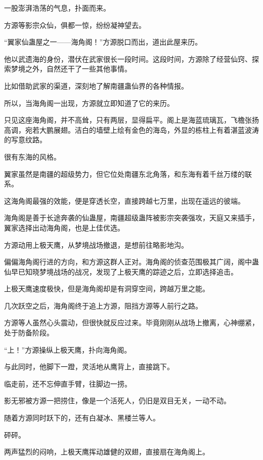 
\begin{this_body}

一股澎湃浩荡的气息，扑面而来。

方源等影宗众仙，俱都一惊，纷纷凝神望去。

“翼家仙蛊屋之一——海角阁！”方源脱口而出，道出此屋来历。

他以武遗海的身份，潜伏在武家很长一段时间。这段时间，方源除了经营仙窍、探索梦境之外，自然还干了一些其他事情。

比如借助武家的渠道，深刻地了解南疆蛊仙界的各种情报。

所以，当海角阁一出现，方源就立即知道了它的来历。

只见这座海角阁，并不高耸，只有两层，显得扁平。阁上是海蓝琉璃瓦，飞檐张扬高调，宛若大鹏展翅。洁白的墙壁上绘有金色的海岛，外显的栋柱上有着湛蓝波涛的写意纹路。

很有东海的风格。

翼家虽然是南疆的超级势力，但它位处南疆东北角落，和东海有着千丝万缕的联系。

这海角阁最强的效能，便是穿透长空，直接跨越七万里，出现在遥远的彼端。

海角阁是善于长途奔袭的仙蛊屋，南疆超级蛊阵被影宗突袭强攻，天庭又来插手，翼家选择出动海角阁，也是上佳优选。

方源动用上极天鹰，从梦境战场撤退，是想前往略影地沟。

偏偏海角阁行进的方向，和方源这群人正对。海角阁的侦查范围极其广阔，阁中蛊仙早已知晓梦境战场的战况，发现了上极天鹰的踪迹之后，立即选择追击。

上极天鹰速度极快，但是海角阁却是有洞穿空间，跨越万里之能。

几次跃空之后，海角阁终于追上方源，阻挡方源等人前行之路。

方源等人虽然心头震动，但很快就反应过来。毕竟刚刚从战场上撤离，心神绷紧，处于防备阶段。

“上！”方源操纵上极天鹰，扑向海角阁。

与此同时，他脚下一蹬，灵活地从鹰背上，直接跳下。

临走前，还不忘伸直手臂，往脚边一捞。

影无邪被方源一把捞住，像是一个活死人，仍旧是双目无关，一动不动。

随着方源同时跃下的，还有白凝冰、黑楼兰等人。

砰砰。

两声猛烈的闷响，上极天鹰挥动雄健的双翅，直接扇在海角阁上。


\end{this_body}
